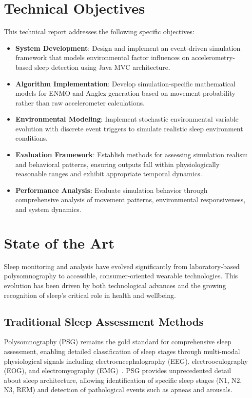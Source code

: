 \documentclass[conference]{IEEEtran}
\begin{document}
\section{Technical Objectives}

This technical report addresses the following specific objectives:

\begin{itemize}
	\item \textbf{System Development}: Design and implement an event-driven simulation framework that models environmental factor influences on accelerometry-based sleep detection using Java MVC architecture.
	\item \textbf{Algorithm Implementation}: Develop simulation-specific mathematical models for ENMO and Anglez generation based on movement probability rather than raw accelerometer calculations.
	\item \textbf{Environmental Modeling}: Implement stochastic environmental variable evolution with discrete event triggers to simulate realistic sleep environment conditions.
	\item \textbf{Evaluation Framework}: Establish methods for assessing simulation realism and behavioral patterns, ensuring outputs fall within physiologically reasonable ranges and exhibit appropriate temporal dynamics.
	\item \textbf{Performance Analysis}: Evaluate simulation behavior through comprehensive analysis of movement patterns, environmental responsiveness, and system dynamics.
\end{itemize}

\section{State of the Art}

Sleep monitoring and analysis have evolved significantly from laboratory-based polysomnography to accessible, consumer-oriented wearable technologies. This evolution has been driven by both technological advances and the growing recognition of sleep's critical role in health and wellbeing.

\subsection{Traditional Sleep Assessment Methods}

Polysomnography (PSG) remains the gold standard for comprehensive sleep assessment, enabling detailed classification of sleep stages through multi-modal physiological signals including electroencephalography (EEG), electrooculography (EOG), and electromyography (EMG)~\cite{Sadeh2011, PMC1740426}. PSG provides unprecedented detail about sleep architecture, allowing identification of specific sleep stages (N1, N2, N3, REM) and detection of pathological events such as apneas and arousals.
\end{document}
